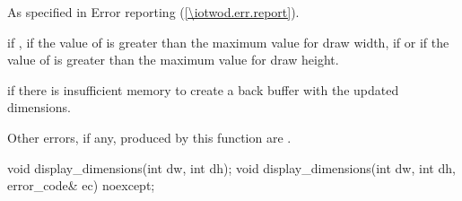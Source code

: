 \begin{itemdescr}
\pnum
\throws
As specified in Error reporting (\ref{\iotwod.err.report}).

\pnum
\errors
{} if , if the value of  is greater than the maximum value for draw width, if  or if the value of  is greater than the maximum value for draw height.

 if there is insufficient memory to create a back buffer with the updated dimensions.

Other errors, if any, produced by this function are .
\end{itemdescr}

\begin{itemdecl}
void display_dimensions(int dw, int dh);
void display_dimensions(int dw, int dh, error_code& ec) noexcept;
\end{itemdecl}
